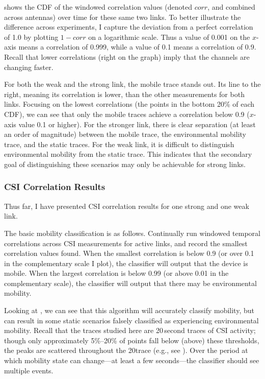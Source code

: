  shows the CDF of the windowed correlation values (denoted $\mathit{corr}$, and combined across antennas) over time for these same two links. To better illustrate the difference across experiments, I capture the deviation from a perfect correlation of 1.0 by plotting $1-\mathit{corr}$ on a logarithmic scale. Thus a value of 0.001 on the $x$-axis means a correlation of 0.999, while a value of 0.1 means a correlation of 0.9. Recall that lower correlations (right on the graph) imply that the channels are changing faster.

For both the weak and the strong link, the mobile trace stands out. Its line to the right, meaning its correlation is lower, than the other measurements for both links. Focusing on the lowest correlations (the points in the bottom 20\% of each CDF), we can see that only the mobile traces achieve a correlation below 0.9 ($x$-axis value 0.1 or higher). For the stronger link, there is clear separation (at least an order of magnitude) between the mobile trace, the environmental mobility trace, and the static traces. For the weak link, it is difficult to distinguish environmental mobility from the static trace. This indicates that the secondary goal of distinguishing these scenarios may only be achievable for strong links.

\subsubsection{CSI Correlation Results}
Thus far, I have presented CSI correlation results for one strong and one weak link.

The basic mobility classification is as follows. Continually run windowed temporal correlations across CSI measurements for active links, and record the smallest correlation values found. When the smallest correlation is below 0.9 (or over 0.1 in the complementary scale I plot), the classifier will output that the device is mobile. When the largest correlation is below 0.99 (or above 0.01 in the complementary scale), the classifier will output that there may be environmental mobility.

Looking at , we can see that this algorithm will accurately classify mobility, but can result in some static scenarios falsely classified as experiencing environmental mobility. Recall that the traces studied here are 20\,second traces of CSI activity; though only approximately 5\%--20\% of points fall below (above) these thresholds, the peaks are scattered throughout the 20\s trace (e.g., see ). Over the period at which mobility state can change---at least a few seconds---the classifier should see multiple events.


